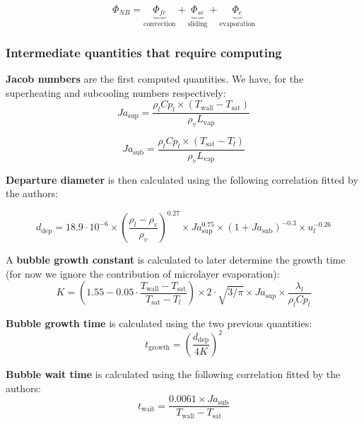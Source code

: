\begin{equation}
	\Phi_{NB}
	=
	\underbrace{\Phi_{fc}}_\text{convection}
	+
	\underbrace{\Phi_{sc}}_\text{sliding}
	+
	\underbrace{\Phi_{e}}_\text{evaporation}
\end{equation}

\subsubsection{Intermediate quantities that require computing}

\textbf{Jacob numbers} are the first computed quantities. We have, for the superheating and subcooling numbers respectively:
\begin{equation}
	Ja_\text{sup} = \frac{\rho_l Cp_l \times (T_\text{wall} - T_\text{sat})}{\rho_v L_\text{vap}}
\end{equation}

\begin{equation}
	Ja_\text{sub} = \frac{\rho_l Cp_l \times (T_\text{sat} - T_l)}{\rho_v L_\text{vap}}
\end{equation}

\textbf{Departure diameter} is then calculated using the following correlation fitted by the authors:

\begin{equation}
	d_\text{dep}
	=
	18.9 \cdot 10^{-6}
	\times
	\left(\frac{\rho_l-\rho_v}{\rho_v}\right)^{0.27}
	\times
	Ja_\text{sup}^{0.75}
	\times
	(1+Ja_\text{sub})^{-0.3}
	\times
	u_l^{-0.26}
\end{equation}

A \textbf{bubble growth constant} is calculated to later determine the growth time (for now we ignore the contribution of microlayer evaporation):
\begin{equation}
	K
	=
	\left(1.55 - 
	0.05 \cdot \frac{T_\text{wall}-T_\text{sat}}{T_\text{sat}-T_l}\right)
	\times
	2 \cdot \sqrt{3/\pi}
	\times
	Ja_\text{sup}
	\times
	\frac{\lambda_l}{\rho_l Cp_l}
\end{equation}

\textbf{Bubble growth time} is calculated using the two previous quantities:
\begin{equation}
	t_\text{growth}
	=
	\left(\frac{d_\text{dep}}{4K}\right)^2
\end{equation}

\textbf{Bubble wait time} is calculated using the following correlation fitted by the authors:
\begin{equation}
	t_\text{wait}
	=
	\frac{0.0061 \times Ja_\text{sub}}{T_\text{wall}-T_\text{sat}}
\end{equation}

